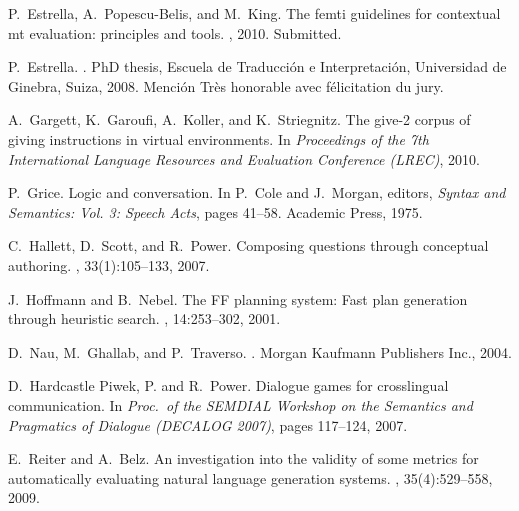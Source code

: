 \documentclass[11pt]{article}
\begin{document}
\begin{thebibliography}{}
P.~Estrella, A.~Popescu-Belis, and M.~King.
\newblock The femti guidelines for contextual mt evaluation: principles and
  tools.
, 2010.
\newblock Submitted.

P.~Estrella.
.
\newblock PhD thesis, Escuela de Traducción e Interpretación, Universidad de
  Ginebra, Suiza, 2008.
\newblock Menci\'on Tr\`es honorable avec f\'elicitation du jury.

A.~Gargett, K.~Garoufi, A.~Koller, and K.~Striegnitz.
\newblock The give-2 corpus of giving instructions in virtual environments.
\newblock In {\em Proceedings of the 7th International Language Resources and
  Evaluation Conference (LREC)}, 2010.

P.~Grice.
\newblock Logic and conversation.
\newblock In P.~Cole and J.~Morgan, editors, {\em Syntax and Semantics: Vol. 3:
  Speech Acts}, pages 41--58. Academic Press, 1975.

C.~Hallett, D.~Scott, and R.~Power.
\newblock Composing questions through conceptual authoring.
, 33(1):105--133, 2007.

J.~Hoffmann and B.~Nebel.
\newblock The {FF} planning system: Fast plan generation through heuristic
  search.
, 14:253--302, 2001.

D.~Nau, M.~Ghallab, and P.~Traverso.
.
\newblock Morgan Kaufmann Publishers Inc., 2004.

D.~Hardcastle Piwek, P. and R.~Power.
\newblock Dialogue games for crosslingual communication.
\newblock In {\em Proc.\ of the {SEMDIAL} Workshop on the Semantics and
  Pragmatics of Dialogue ({DECALOG} 2007)}, pages 117--124, 2007.

E.~Reiter and A.~Belz.
\newblock An investigation into the validity of some metrics for automatically
  evaluating natural language generation systems.
, 35(4):529--558, 2009.


\end{thebibliography}
\end{document}
